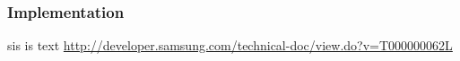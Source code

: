 \subsubsection{Implementation}\label{subsection:license-samsung-implementation}
sis is text
\url{http://developer.samsung.com/technical-doc/view.do?v=T000000062L}
